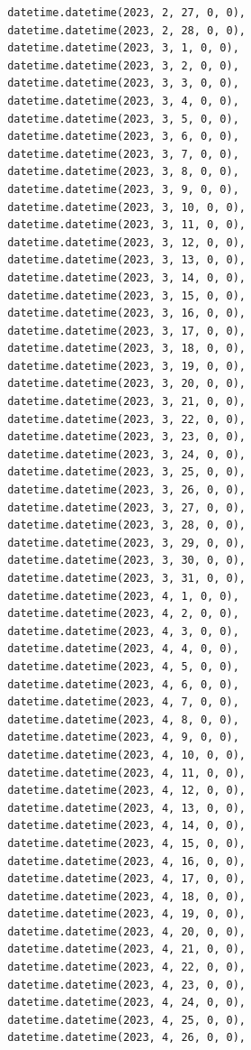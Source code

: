 \documentclass[
  letterpaper,
  DIV=11,
  numbers=noendperiod,
  oneside]{scrreprt}
\begin{document}
\begin{verbatim}
       datetime.datetime(2023, 2, 27, 0, 0),
       datetime.datetime(2023, 2, 28, 0, 0),
       datetime.datetime(2023, 3, 1, 0, 0),
       datetime.datetime(2023, 3, 2, 0, 0),
       datetime.datetime(2023, 3, 3, 0, 0),
       datetime.datetime(2023, 3, 4, 0, 0),
       datetime.datetime(2023, 3, 5, 0, 0),
       datetime.datetime(2023, 3, 6, 0, 0),
       datetime.datetime(2023, 3, 7, 0, 0),
       datetime.datetime(2023, 3, 8, 0, 0),
       datetime.datetime(2023, 3, 9, 0, 0),
       datetime.datetime(2023, 3, 10, 0, 0),
       datetime.datetime(2023, 3, 11, 0, 0),
       datetime.datetime(2023, 3, 12, 0, 0),
       datetime.datetime(2023, 3, 13, 0, 0),
       datetime.datetime(2023, 3, 14, 0, 0),
       datetime.datetime(2023, 3, 15, 0, 0),
       datetime.datetime(2023, 3, 16, 0, 0),
       datetime.datetime(2023, 3, 17, 0, 0),
       datetime.datetime(2023, 3, 18, 0, 0),
       datetime.datetime(2023, 3, 19, 0, 0),
       datetime.datetime(2023, 3, 20, 0, 0),
       datetime.datetime(2023, 3, 21, 0, 0),
       datetime.datetime(2023, 3, 22, 0, 0),
       datetime.datetime(2023, 3, 23, 0, 0),
       datetime.datetime(2023, 3, 24, 0, 0),
       datetime.datetime(2023, 3, 25, 0, 0),
       datetime.datetime(2023, 3, 26, 0, 0),
       datetime.datetime(2023, 3, 27, 0, 0),
       datetime.datetime(2023, 3, 28, 0, 0),
       datetime.datetime(2023, 3, 29, 0, 0),
       datetime.datetime(2023, 3, 30, 0, 0),
       datetime.datetime(2023, 3, 31, 0, 0),
       datetime.datetime(2023, 4, 1, 0, 0),
       datetime.datetime(2023, 4, 2, 0, 0),
       datetime.datetime(2023, 4, 3, 0, 0),
       datetime.datetime(2023, 4, 4, 0, 0),
       datetime.datetime(2023, 4, 5, 0, 0),
       datetime.datetime(2023, 4, 6, 0, 0),
       datetime.datetime(2023, 4, 7, 0, 0),
       datetime.datetime(2023, 4, 8, 0, 0),
       datetime.datetime(2023, 4, 9, 0, 0),
       datetime.datetime(2023, 4, 10, 0, 0),
       datetime.datetime(2023, 4, 11, 0, 0),
       datetime.datetime(2023, 4, 12, 0, 0),
       datetime.datetime(2023, 4, 13, 0, 0),
       datetime.datetime(2023, 4, 14, 0, 0),
       datetime.datetime(2023, 4, 15, 0, 0),
       datetime.datetime(2023, 4, 16, 0, 0),
       datetime.datetime(2023, 4, 17, 0, 0),
       datetime.datetime(2023, 4, 18, 0, 0),
       datetime.datetime(2023, 4, 19, 0, 0),
       datetime.datetime(2023, 4, 20, 0, 0),
       datetime.datetime(2023, 4, 21, 0, 0),
       datetime.datetime(2023, 4, 22, 0, 0),
       datetime.datetime(2023, 4, 23, 0, 0),
       datetime.datetime(2023, 4, 24, 0, 0),
       datetime.datetime(2023, 4, 25, 0, 0),
       datetime.datetime(2023, 4, 26, 0, 0),

\end{verbatim}
\end{document}

